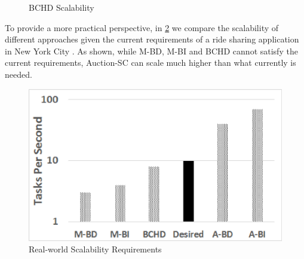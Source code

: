 \begin{figure}[h]
    \centering
    \vspace{-0.15in}
    \caption{BCHD Scalability}
    \label{fig:bss}
\end{figure}

To provide a more practical perspective, in \cref{fig:req} we compare the scalability of different approaches given the current requirements of a ride sharing application in New York City \cite{NYCTaxi}. As shown, while M-BD, M-BI and BCHD cannot satisfy the current requirements, Auction-SC can scale much higher than what currently is needed.

\begin{figure}[h]
	\centering
	\includegraphics[width = 0.75\columnwidth]{figures/scale_req.eps}
	\vspace{-0.1in}
	\caption{Real-world Scalability Requirements}\label{fig:req}
\end{figure}

